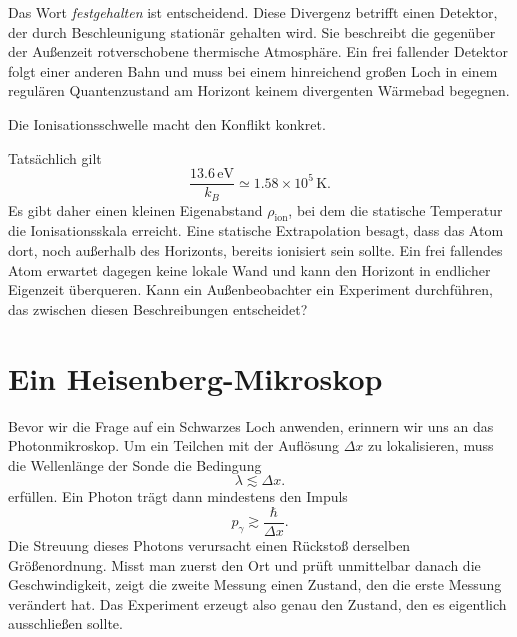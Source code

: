 Das Wort \emph{festgehalten} ist entscheidend. Diese Divergenz betrifft einen Detektor, der durch Beschleunigung stationär gehalten wird. Sie beschreibt die gegenüber der Außenzeit rotverschobene thermische Atmosphäre. Ein frei fallender Detektor folgt einer anderen Bahn und muss bei einem hinreichend großen Loch in einem regulären Quantenzustand am Horizont keinem divergenten Wärmebad begegnen.

Die Ionisationsschwelle macht den Konflikt konkret.

\begin{classroomqa}
\end{classroomqa}

Tatsächlich gilt
\begin{equation}
\frac{13.6\,\mathrm{eV}}{k_B}\simeq1.58\times10^5\,\mathrm{K}.
\end{equation}
Es gibt daher einen kleinen Eigenabstand \(\rho_{\mathrm{ion}}\), bei dem die statische Temperatur die Ionisationsskala erreicht. Eine statische Extrapolation besagt, dass das Atom dort, noch außerhalb des Horizonts, bereits ionisiert sein sollte. Ein frei fallendes Atom erwartet dagegen keine lokale Wand und kann den Horizont in endlicher Eigenzeit überqueren. Kann ein Außenbeobachter ein Experiment durchführen, das zwischen diesen Beschreibungen entscheidet?

\section{Ein Heisenberg-Mikroskop}

Bevor wir die Frage auf ein Schwarzes Loch anwenden, erinnern wir uns an das Photonmikroskop. Um ein Teilchen mit der Auflösung \(\Delta x\) zu lokalisieren, muss die Wellenlänge der Sonde die Bedingung
\begin{equation}
\lambda\lesssim\Delta x.
\end{equation}
erfüllen. Ein Photon trägt dann mindestens den Impuls
\begin{equation}
p_\gamma\gtrsim\frac{\hbar}{\Delta x}.
\label{eq:l05-microscope}
\end{equation}
Die Streuung dieses Photons verursacht einen Rückstoß derselben Größenordnung. Misst man zuerst den Ort und prüft unmittelbar danach die Geschwindigkeit, zeigt die zweite Messung einen Zustand, den die erste Messung verändert hat. Das Experiment erzeugt also genau den Zustand, den es eigentlich ausschließen sollte.

